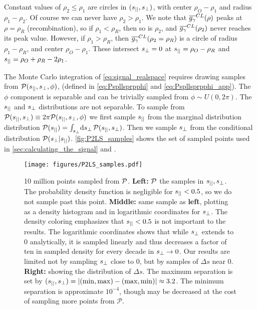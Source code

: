 \documentclass[fleqn,usenatbib]{mnras}
\begin{document}
    Constant values of $\rho_2\leq\rho_1$ are circles in $(s_{||},s_{\perp})$, with
    center $\rho_O-\rho_1$ and radius $\rho_1-\rho_2$.  Of course we can never
    have $\rho_2>\rho_1$.  We note that $\overline{g_\gamma}^{CL}(\rho)$ peaks at
    $\rho=\rho_R$ (recombination), so if $\rho_1<\rho_R$, then so is $\rho_2$,
    and $\overline{g_\gamma}^{CL}(\rho_2)$ never reaches its peak value.  However, if
    $\rho_1>\rho_R$, then $\overline{g_\gamma}^{CL}(\rho_2=\rho_R)$ is a circle of radius
    $\rho_1-\rho_R$, and center $\rho_O-\rho_1$.  These intersect $s_{\perp}=0$ at
    $s_{||}=\rho_O-\rho_R$ and $s_{||}=\rho_O+\rho_R-2\rho_1$.

    \vspace{20pt}

    The Monte Carlo integration of \autoref{eq:signal_realspace} requires
    drawing samples from $\mathcal{P}(s_{||}, s_{\perp}, \phi)$, (defined in
    \autoref{eq:Pspllsprpphi} and  \autoref{eq:Pspllsprpphi_app}).  The $\phi$
    component is separable and can be trivially sampled from $\phi \sim U(0,
    2\pi)$.  The $s_{||}$ and $s_{\perp}$ distributions are not separable.  To sample
    from $\mathcal{P}(s_{||}, s_{\perp}) \equiv 2\pi \mathcal{P}(s_{||}, s_{\perp}, \phi)$ we
    first sample $s_{||}$ from the marginal distribution distribution
    $\mcal{P}(\spll) = \int_{\sprp}\! \dif{\sprp} \,\mcal{P}(\spll, \sprp)$.
    Then we sample $s_{\perp}$ from the conditional distribution $\mathcal{P}(s_{\perp} |
    s_{||})$.  \autoref{fig:P2LS_samples} shows the set of sampled points used in
    \autoref{sec:calculating_the_signal} and
    .

    \begin{figure}
        \centering
        \texttt{[image: figures/P2LS\_samples.pdf]}
        \caption{%
            10 million points sampled from $\mathcal{P}$.  \textbf{Left:}
            $\mathcal{P}$ the samples in $s_{||}, s_{\perp}$.  The probability density
            function is negligible for $s_{||} < 0.5$, so we do not sample past
            this point.  \textbf{Middle:} same sample as \textbf{left}, plotting
            as a density histogram and in logarithmic coordinates for $s_{\perp}$.
            The density coloring emphasizes that $s_{||} < 0.5$ is not important
            to the results.  The logarithmic coordinates shows that while
            $s_{\perp}$ extends to 0 analytically, it is sampled linearly and thus
            decreases a factor of ten in sampled density for every decade in
            $s_{\perp} \rightarrow 0$.  Our results are limited not by sampling
            $s_{\perp}$ close to 0, but by samples of $\Delta s$ near 0.
            \textbf{Right:} showing the distribution of $\Delta s$.  The maximum
            separation is set by $(s_{||}, s_{\perp}) = \lvert  (\rm{min}, \rm{max}) -
            (\rm{max}, \rm{min})  \rvert \approx 3.2$.  The minimum separation is
            approximate $10^{-4}$, though may be decreased at the cost of
            sampling more points from $\mathcal{P}$.%
        }
        \label{fig:P2LS_samples}
    \end{figure}
\end{document}
